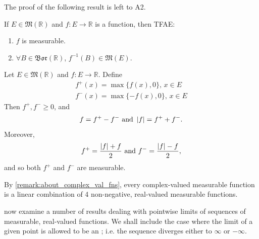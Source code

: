 \documentclass[notoc,notitlepage]{tufte-book}
\newcommand{\Bor}{\mathfrak{Bor}}
\begin{document}
The proof of the following result is left to A2.

\begin{crly}\label{crly:measurability_check_on_the_borel_set}
  If $E \in \mathfrak{M}(\mathbb{R})$ and $f : E \to \mathbb{R}$ is a function,
  then TFAE:
  \begin{enumerate}
    \item $f$ is measurable.
    \item $\forall B \in \Bor(\mathbb{R})$, $f^{-1}(B) \in \mathfrak{M}(E)$.
  \end{enumerate}
\end{crly}

\begin{remark}\label{remark:f_plus_f_minus}
  Let $E \in \mathfrak{M}(\mathbb{R})$ and $f : E \to \mathbb{R}$. Define
  \begin{gather*}
    f^+(x) = \max \{ f(x), 0 \},\, x \in E \\
    f^-(x) = \max \{ -f(x), 0\},\, x \in E
  \end{gather*}
  Then $f^+, f^- \geq 0$, and
  \begin{equation*}
    f = f^+ - f^- \text{ and } \left|f\right| = f^+ + f^-.
  \end{equation*}
  Moreover,
  \begin{equation*}
    f^+ = \frac{\left|f\right| + f}{2} \text{ and } f^- = \frac{\left|f\right| - f}{2},
  \end{equation*}
  and so both $f^+$ and $f^-$ are measurable.

  By \cref{remark:about_complex_val_fns}, every complex-valued measurable function is a
  linear combination of 4 non-negative, real-valued measurable functions.
\end{remark}

 now examine a number of results dealing with pointwise
limits of sequences of measurable, real-valued functions. We shall include the
case where the limit of a given point is allowed to be an ; i.e. the sequence diverges either to $\infty$ or $-\infty$.
\end{document}
